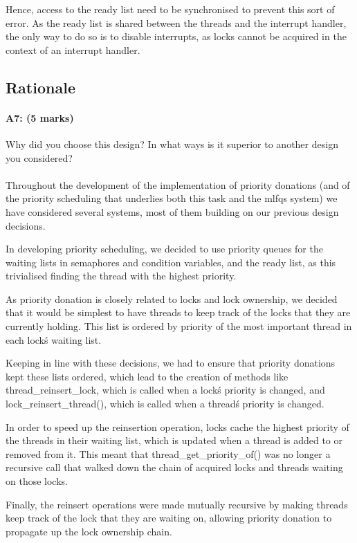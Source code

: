 Hence, access to the ready list need to be synchronised to prevent this sort of error. As the ready list is shared between the threads and the interrupt handler, the only way to do so is to disable interrupts, as locks cannot be acquired in the context of an interrupt handler.


\subsection{Rationale}
\paragraph{A7: (5 marks)}
Why did you choose this design?  In what ways is it superior to another design you considered?
\\
\\
Throughout the development of the implementation of priority donations (and of the priority scheduling that underlies both this task and the mlfqs system) we have considered several systems, most of them building on our previous design decisions.

In developing priority scheduling, we decided to use priority queues for the waiting lists in semaphores and condition variables, and the ready list, as this trivialised finding the thread with the highest priority.

As priority donation is closely related to locks and lock ownership, we decided that it would be simplest to have threads to keep track of the locks that they are currently holding. This list is ordered by priority of the most important thread in each lock\'s waiting list.

Keeping in line with these decisions, we had to ensure that priority donations kept these lists ordered, which lead to the creation of methods like thread\_reinsert\_lock, which is called when a lock\'s priority is changed, and lock\_reinsert\_thread(), which is called when a thread\'s priority is changed.

In order to speed up the reinsertion operation, locks cache the highest priority of the threads in their waiting list, which is updated when a thread is added to or removed from it. This meant that thread\_get\_priority\_of() was no longer a recursive call that walked down the chain of acquired locks and threads waiting on those locks.

Finally, the reinsert operations were made mutually recursive by making threads keep track of the lock that they are waiting on, allowing priority donation to propagate up the lock ownership chain.

